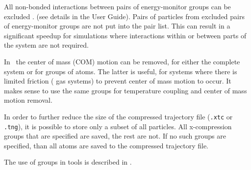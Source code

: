 \begin{description}
All non-bonded interactions between pairs of energy-monitor groups can
be excluded
{.}
{(see details in the User Guide).}
Pairs of particles from excluded pairs of energy-monitor groups
are not put into the pair list.
This can result in a significant speedup
for simulations where interactions within or between parts of the system
are not required.

\item[\swapindex{center of mass}{group}\index{removing COM motion}]
In \gromacs\ the center of mass (COM) motion can be removed, for
either the complete system or for groups of atoms. The latter is
useful, {\eg} for systems where there is limited friction ({\eg} gas
systems) to prevent center of mass motion to occur. It makes sense to
use the same groups for temperature coupling and center of mass motion
removal.

\item[\swapindex{Compressed position output}{group}]

In order to further reduce the size of the compressed trajectory file
({\tt .xtc{}} or {\tt .tng{}}), it is possible
to store only a subset of all particles. All x-compression groups that
are specified are saved, the rest are not. If no such groups are
specified, than all atoms are saved to the compressed trajectory file.

\end{description}
The use of groups in {\gromacs} tools is described in
.

